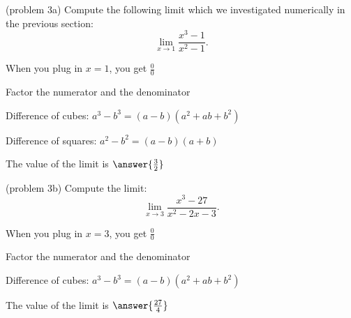 \documentclass[handout]{ximera}
\begin{document}
\begin{problem}(problem 3a)
  Compute the following limit which we investigated numerically in the previous section:
  \[
  \lim_{x \to 1} \frac{x^3 - 1}{x^2 -1}.
  \]
  
    \begin{hint}
      When you plug in $x = 1$, you get $\frac00$
    \end{hint}
    \begin{hint}
      Factor the numerator and the denominator
    \end{hint}
    \begin{hint}
      Difference of cubes: $a^3 - b^3 = (a-b)(a^2 + ab +b^2)$
    \end{hint}
		\begin{hint}
      Difference of squares: $a^2 - b^2 = (a-b)(a+b)$
    \end{hint}

		The value of the limit is
		 $\answer{\frac32}$
		
\end{problem}


\begin{problem}(problem 3b)
  Compute the limit:
  \[
  \lim_{x \to 3} \frac{x^3 - 27}{x^2 -2x - 3}.
  \]
  
    \begin{hint}
      When you plug in $x = 3$, you get $\frac00$
    \end{hint}
    \begin{hint}
      Factor the numerator and the denominator
    \end{hint}
    \begin{hint}
      Difference of cubes: $a^3 - b^3 = (a-b)(a^2 + ab +b^2)$
    \end{hint}

		The value of the limit is
		 $\answer{\frac{27}{4}}$
		
\end{problem}
\end{document}
